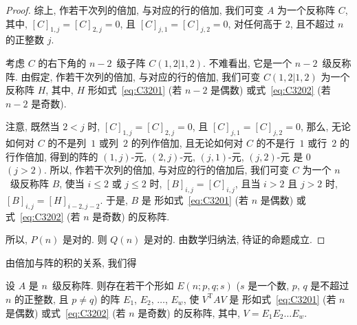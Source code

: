 \documentclass[../libro.tex]{subfiles}
\begin{document}
\begin{proof}
    综上, 作若干次列的倍加, 与对应的行的倍加,
    我们可变 \(A\) 为一个反称阵 \(C\),
    其中,
    \([C]_{1,j} = [C]_{2,j} = 0\),
    且 \([C]_{j,1} = [C]_{j,2} = 0\),
    对任何高于 \(2\), 且不超过 \(n\) 的正整数 \(j\).

    考虑 \(C\) 的右下角的 \(n-2\)~级子阵 \(C({1,2}|{1,2})\).
    不难看出, 它是一个 \(n-2\)~级反称阵.
    由假定,
    作若干次列的倍加, 与对应的行的倍加,
    我们可变 \(C({1,2}|{1,2})\) 为一个反称阵 \(H\),
    其中, \(H\) 形如式~\eqref{eq:C3201} (若 \(n-2\) 是偶数)
    或式~\eqref{eq:C3202} (若 \(n-2\) 是奇数).

    注意, 既然当 \(2 < j\) 时,
    \([C]_{1,j} = [C]_{2,j} = 0\),
    且 \([C]_{j,1} = [C]_{j,2} = 0\),
    那么,
    无论如何对 \(C\) 的不是列~\(1\) 或列~\(2\) 的列作倍加,
    且无论如何对 \(C\) 的不是行~\(1\) 或行~\(2\) 的行作倍加,
    得到的阵的
    \((1, j)\)-元, \((2, j)\)-元, \((j, 1)\)-元, \((j, 2)\)-元%
    是 \(0\) \((j > 2)\).
    所以, 作若干次列的倍加, 与对应的行的倍加后,
    我们可变 \(C\) 为一个 \(n\)~级反称阵 \(B\),
    使当 \(i \leq 2\) 或 \(j \leq 2\) 时,
    \([B]_{i,j} = [C]_{i,j}\),
    且当 \(i > 2\) 且 \(j > 2\) 时,
    \([B]_{i,j} = [H]_{i-2,j-2}\).
    于是, \(B\) 是%
    形如式~\eqref{eq:C3201} (若 \(n\) 是偶数)
    或式~\eqref{eq:C3202} (若 \(n\) 是奇数)
    的反称阵.

    所以, \(P(n)\) 是对的.
    则 \(Q(n)\) 是对的.
    由数学归纳法, 待证的命题成立.

\end{proof}

由倍加与阵的积的关系, 我们得

\begin{theorem}
    设 \(A\) 是 \(n\)~级反称阵.
    则存在若干个形如 \(E(n; p, q; s)\)
    (\(s\) 是一个数, %
    \(p\), \(q\) 是不超过 \(n\) 的正整数,
    且 \(p \neq q\)) %
    的阵
    \(E_1\), \(E_2\), \(\dots\), \(E_w\),
    使 \(V^{\mathrm{T}} AV\) 是%
    形如式~\eqref{eq:C3201} (若 \(n\) 是偶数)
    或式~\eqref{eq:C3202} (若 \(n\) 是奇数)
    的反称阵,
    其中, \(V = E_1 E_2 \dots E_w\).
\end{theorem}
\end{document}
